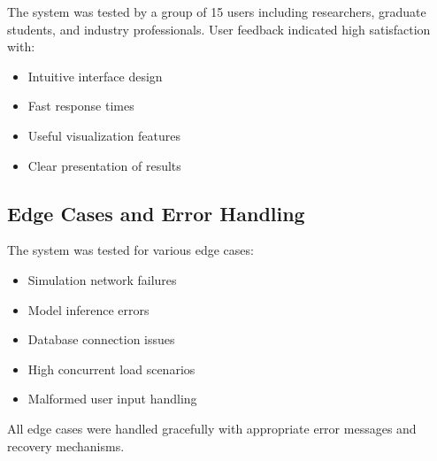 The system was tested by a group of 15 users including researchers, graduate students, and industry professionals. User feedback indicated high satisfaction with:

\begin{itemize}
    \item Intuitive interface design
    \item Fast response times
    \item Useful visualization features
    \item Clear presentation of results
\end{itemize}

\subsection{Edge Cases and Error Handling}

The system was tested for various edge cases:

\begin{itemize}
    \item Simulation network failures
    \item Model inference errors
    \item Database connection issues
    \item High concurrent load scenarios
    \item Malformed user input handling
\end{itemize}

All edge cases were handled gracefully with appropriate error messages and recovery mechanisms.

